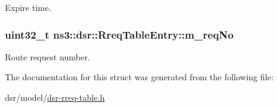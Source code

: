 Expire time. 

\subsubsection[{\texorpdfstring{m\+\_\+req\+No}{m_reqNo}}]{\setlength{\rightskip}{0pt plus 5cm}uint32\+\_\+t ns3\+::dsr\+::\+Rreq\+Table\+Entry\+::m\+\_\+req\+No}\hypertarget{structns3_1_1dsr_1_1RreqTableEntry_af4725e1e7ff15ef690a09c748ab50550}{}\label{structns3_1_1dsr_1_1RreqTableEntry_af4725e1e7ff15ef690a09c748ab50550}


Route request number. 



The documentation for this struct was generated from the following file\+:\begin{DoxyCompactItemize}
\item 
dsr/model/\hyperlink{dsr-rreq-table_8h}{dsr-\/rreq-\/table.\+h}\end{DoxyCompactItemize}
